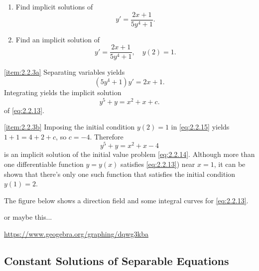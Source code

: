\documentclass{ximera}
\begin{document}
\begin{example}\label{example:2.2.3}
\begin{enumerate}
\item\label{item:2.2.3a}
Find implicit solutions of
\begin{equation} \label{eq:2.2.13}
y'=\frac{2x+1}{5y^4+1}.
\end{equation}
\item\label{item:2.2.3b}
Find an implicit solution of
\begin{equation} \label{eq:2.2.14}
y'=\frac{2x+1}{5y^4+1},\quad y(2)=1.
\end{equation}
\end{enumerate}
 
\begin{explanation}
\ref{item:2.2.3a}
 Separating variables yields
$$
(5y^4+1)y'=2x+1.
$$
Integrating yields the implicit solution
\begin{equation} \label{eq:2.2.15}
y^5+y=x^2+x+ c.
\end{equation}
of \eqref{eq:2.2.13}.
 
\ref{item:2.2.3b} Imposing the initial condition $y(2)=1$ in
\eqref{eq:2.2.15} yields $1+1=4+2+c$, so $c=-4$. Therefore
$$
y^5+y=x^2+x-4
$$
is an implicit solution of the initial value problem \eqref{eq:2.2.14}.
Although more than one differentiable function $y=y(x)$ satisfies
\ref{eq:2.2.13}) near $x=1$, it can be shown that there's only
one such function that satisfies the initial condition $y(1)=2$.
 
The figure below shows a direction field and some integral curves
for \eqref{eq:2.2.13}.

\begin{center}
\end{center}

or maybe this...

\href{https://www.geogebra.org/graphing/dqwg3kba}{https://www.geogebra.org/graphing/dqwg3kba}
 
 
\end{explanation}
\end{example}
 
\subsection*{Constant Solutions of Separable Equations}
 
\end{document}
